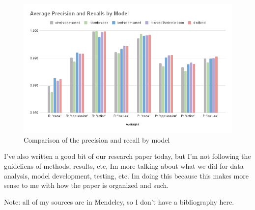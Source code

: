 \documentclass[11pt,letterpaper]{article}
\begin{document}
\begin{figure}
    \centering
    \includegraphics[scale=0.6]{images/compare_PR.png}
    \caption{Comparison of the precision and recall by model}
    \label{fig:compare_PR.png}
\end{figure}

I've also written a good bit of our research paper today, but I'm not following the guideliens of methods, results, etc, Im more talking about what we did for data analysis, model development, testing, etc. Im doing this because this makes more sense to me with how the paper is organized and such.



\newpage
Note: all of my sources are in Mendeley, so I don't have a bibliography here.
\end{document}
